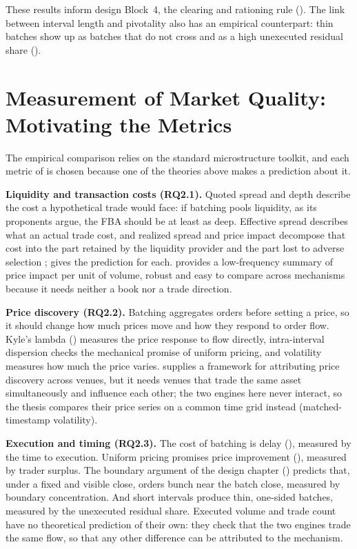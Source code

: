 These results inform design Block~4, the clearing and rationing rule
(). The link between interval length and pivotality
also has an empirical counterpart: thin batches show up as batches that
do not cross and as a high unexecuted residual share ().

\section{Measurement of Market Quality: Motivating the Metrics}
\label{sec:quality}

The empirical comparison relies on the standard microstructure toolkit,
and each metric of  is chosen because one of the
theories above makes a prediction about it.

\textbf{Liquidity and transaction costs (RQ2.1).} Quoted spread and depth
describe the cost a hypothetical trade would face: if batching pools
liquidity, as its proponents argue, the FBA should be at least as deep.
Effective spread describes what an actual trade cost, and realized spread
and price impact decompose that cost into the part retained by the
liquidity provider and the part lost to adverse selection
\citep{hasbrouck1993assessing};  gives the
prediction for each. \citet{amihud2002illiquidity} provides a
low-frequency summary of price impact per unit of volume, robust and easy
to compare across mechanisms because it needs neither a book nor a trade
direction.

\textbf{Price discovery (RQ2.2).} Batching aggregates orders before
setting a price, so it should change how much prices move and how they
respond to order flow. Kyle's lambda () measures the
price response to flow directly, intra-interval dispersion checks the
mechanical promise of uniform pricing, and volatility measures how much
the price varies. \citet{hasbrouck1995onesecurity} supplies a framework
for attributing price discovery across venues, but it needs venues that
trade the same asset simultaneously and influence each other; the two
engines here never interact, so the thesis compares their price series on
a common time grid instead (matched-timestamp volatility).

\textbf{Execution and timing (RQ2.3).} The cost of batching is delay
(), measured by the time to execution. Uniform
pricing promises price improvement (), measured by
trader surplus. The boundary argument of the design chapter
() predicts that, under a fixed and visible
close, orders bunch near the batch close, measured by boundary
concentration. And short intervals produce thin, one-sided batches,
measured by the unexecuted residual share. Executed volume and trade count
have no theoretical prediction of their own: they check that the two
engines trade the same flow, so that any other difference can be
attributed to the mechanism.

